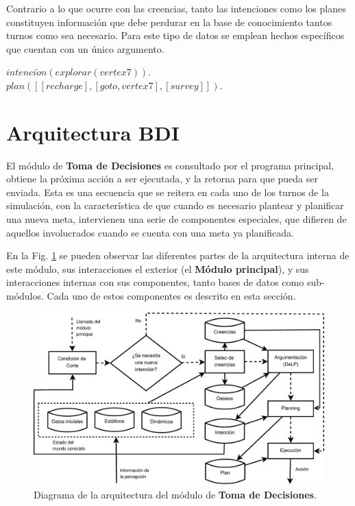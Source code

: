 \documentclass[oneside]{book}
\theoremstyle{definition}
\newcommand{\lit}[1]{\mbox{$ #1$}}
\begin{document}
Contrario a lo que ocurre con las creencias, tanto las intenciones como los planes 
constituyen información que debe perdurar en la base de conocimiento tantos turnos 
como sea necesario. Para este tipo de datos se emplean hechos específicos que cuentan 
con un único argumento.

\vspace*{1em}
\noindent\lit{intenci\acute{o}n(explorar(vertex7)).}\\
\lit{plan([[recharge], [goto, vertex7], [survey]]).}

\section{Arquitectura BDI} %

\label{sec:arquitecturaBDI}

El módulo de \textbf{Toma de Decisiones} es consultado por el programa 
principal, obtiene la próxima acción a ser ejecutada, y la retorna para que 
pueda ser enviada. Esta es una secuencia que se reitera en cada uno de los 
turnos de la simulación, con la característica de que cuando es necesario 
plantear y planificar una nueva meta, intervienen una serie de componentes 
especiales, que difieren de aquellos involucrados cuando se cuenta con una 
meta ya planificada. 

En la Fig. \ref{fig:agentProlog} se pueden observar las diferentes partes de la
arquitectura interna de este módulo, sus interacciones el exterior (el 
\textbf{Módulo principal}), y sus interacciones internas con sus componentes,
tanto bases de datos como sub-módulos. Cada uno de estos componentes es 
descrito en esta sección.

\begin{figure}
 \includegraphics[width=\textwidth]{agent_prolog.eps}
 \caption{Diagrama de la arquitectura del módulo de \textbf{Toma de Decisiones}.}
 \label{fig:agentProlog}
\end{figure}
\end{document}
